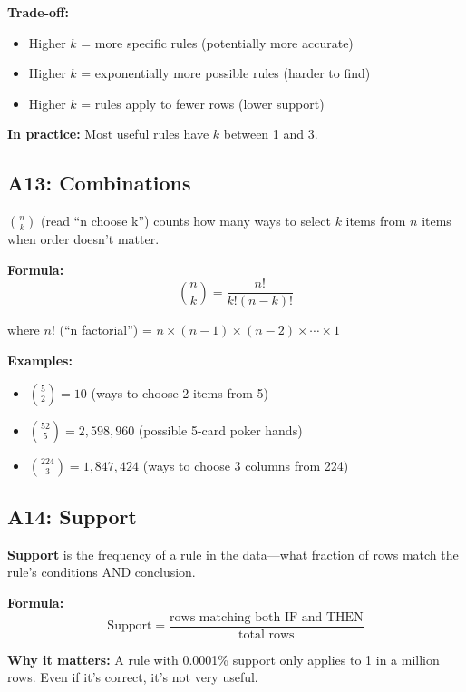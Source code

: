 \documentclass[11pt,a4paper]{article}
\begin{document}
\textbf{Trade-off:}
\begin{itemize}
    \item Higher $k$ = more specific rules (potentially more accurate)
    \item Higher $k$ = exponentially more possible rules (harder to find)
    \item Higher $k$ = rules apply to fewer rows (lower support)
\end{itemize}

\textbf{In practice:} Most useful rules have $k$ between 1 and 3.

\subsection*{A13: Combinations}
\label{A13}

$\binom{n}{k}$ (read ``n choose k'') counts how many ways to select $k$ items from $n$ items when order doesn't matter.

\textbf{Formula:}
\[
\binom{n}{k} = \frac{n!}{k!(n-k)!}
\]

where $n!$ (``n factorial'') = $n \times (n-1) \times (n-2) \times \cdots \times 1$

\textbf{Examples:}
\begin{itemize}
    \item $\binom{5}{2} = 10$ (ways to choose 2 items from 5)
    \item $\binom{52}{5} = 2,598,960$ (possible 5-card poker hands)
    \item $\binom{224}{3} = 1,847,424$ (ways to choose 3 columns from 224)
\end{itemize}

\subsection*{A14: Support}
\label{A14}

\textbf{Support} is the frequency of a rule in the data---what fraction of rows match the rule's conditions AND conclusion.

\textbf{Formula:}
\[
\text{Support} = \frac{\text{rows matching both IF and THEN}}{\text{total rows}}
\]

\textbf{Why it matters:} A rule with 0.0001\% support only applies to 1 in a million rows. Even if it's correct, it's not very useful.
\end{document}
